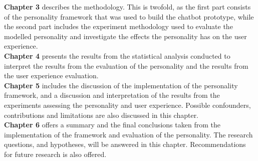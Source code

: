 \textbf{Chapter 3} describes the methodology. This is twofold, as the first part consists of the personality framework that was used to build the chatbot prototype, while the second part includes the experiment methodology used to evaluate the modelled personality and investigate the effects the personality has on the user experience.\\

\textbf{Chapter 4} presents the results from the statistical analysis conducted to interpret the results from the evaluation of the personality and the results from the user experience evaluation.\\

\textbf{Chapter 5} includes the discussion of the implementation of the personality framework, and a discussion and interpretation of the results from the experiments assessing the personality and user experience. Possible confounders, contributions and limitations are also discussed in this chapter.\\

\textbf{Chapter 6} offers a summary and the final conclusions taken from the implementation of the framework and evaluation of the personality. The research questions, and hypotheses, will be answered in this chapter. Recommendations for future research is also offered.\\